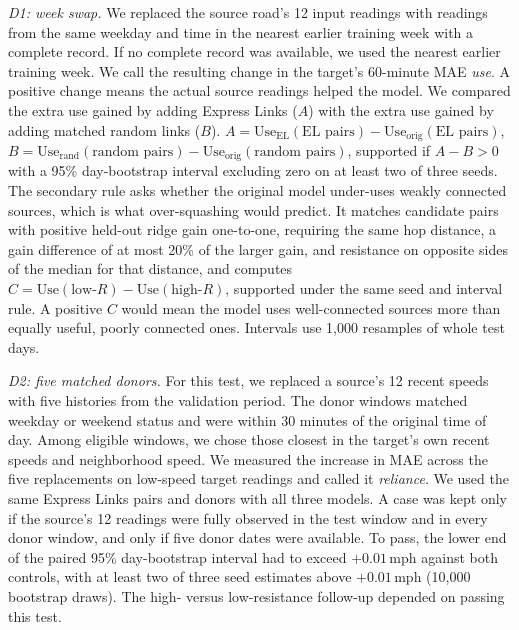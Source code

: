 \documentclass[journal]{IEEEtran}
\newcommand{\ms}{\,mph}
\begin{document}
\textit{D1: week swap.} We replaced the source road's 12 input readings with readings from the same weekday and time in the nearest earlier training week with a complete record. If no complete record was available, we used the nearest earlier training week. We call the resulting change in the target's 60-minute MAE \emph{use}. A positive change means the actual source readings helped the model. We compared the extra use gained by adding Express Links ($A$) with the extra use gained by adding matched random links ($B$).
$A=\mathrm{Use}_{\mathrm{EL}}(\text{EL pairs})-\mathrm{Use}_{\mathrm{orig}}(\text{EL pairs})$, $B=\mathrm{Use}_{\mathrm{rand}}(\text{random pairs})-\mathrm{Use}_{\mathrm{orig}}(\text{random pairs})$, supported if $A-B>0$ with a 95\% day-bootstrap interval excluding zero on at least two of three seeds. The secondary rule asks whether the original model under-uses weakly connected sources, which is what over-squashing would predict. It matches candidate pairs with positive held-out ridge gain one-to-one, requiring the same hop distance, a gain difference of at most 20\% of the larger gain, and resistance on opposite sides of the median for that distance, and computes $C=\mathrm{Use}(\text{low-}R)-\mathrm{Use}(\text{high-}R)$, supported under the same seed and interval rule. A positive $C$ would mean the model uses well-connected sources more than equally useful, poorly connected ones. Intervals use 1{,}000 resamples of whole test days.

\textit{D2: five matched donors.} For this test, we replaced a source's 12 recent speeds with five histories from the validation period. The donor windows matched weekday or weekend status and were within 30 minutes of the original time of day. Among eligible windows, we chose those closest in the target's own recent speeds and neighborhood speed. We measured the increase in MAE across the five replacements on low-speed target readings and called it \emph{reliance}. We used the same Express Links pairs and donors with all three models. A case was kept only if the source's 12 readings were fully observed in the test window and in every donor window, and only if five donor dates were available. To pass, the lower end of the paired 95\% day-bootstrap interval had to exceed $+0.01$\ms{} against both controls, with at least two of three seed estimates above $+0.01$\ms{} (10{,}000 bootstrap draws). The high- versus low-resistance follow-up depended on passing this test.
\end{document}
